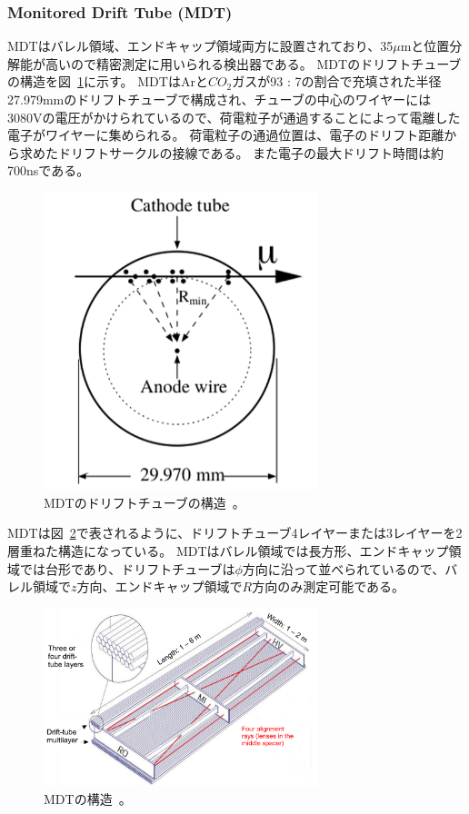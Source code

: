 \subsubsection{Monitored Drift Tube (MDT)}
MDTはバレル領域、エンドキャップ領域両方に設置されており、35$\mu$mと位置分解能が高いので精密測定に用いられる検出器である。
MDTのドリフトチューブの構造を図~\ref{fig:2-21}に示す。
MDTはArと$CO_{2}$ガスが93 : 7の割合で充填された半径27.979mmのドリフトチューブで構成され、チューブの中心のワイヤーには3080Vの電圧がかけられているので、荷電粒子が通過することによって電離した電子がワイヤーに集められる。
荷電粒子の通過位置は、電子のドリフト距離から求めたドリフトサークルの接線である。
また電子の最大ドリフト時間は約700nsである。

\begin{figure}[h]
  \centering
  \includegraphics[clip, width=8cm]{fig/2/mdt_driftTube.png}
  \caption{MDTのドリフトチューブの構造~\cite{Aad:1129811}。}
  \label{fig:2-21}
\end{figure}

MDTは図~\ref{fig:2-22}で表されるように、ドリフトチューブ4レイヤーまたは3レイヤーを2層重ねた構造になっている。
MDTはバレル領域では長方形、エンドキャップ領域では台形であり、ドリフトチューブは$\phi$方向に沿って並べられているので、バレル領域で$z$方向、エンドキャップ領域で$R$方向のみ測定可能である。

\begin{figure}[h]
  \centering
  \includegraphics[clip, width=8cm]{fig/2/MDT_chamber_schematics_2.pdf}
  \caption{MDTの構造~\cite{Aad:1129811}。}
  \label{fig:2-22}
\end{figure}

